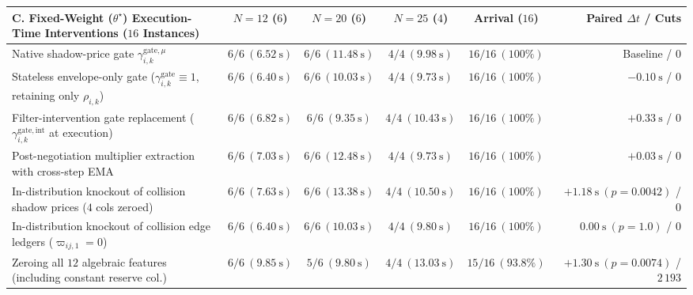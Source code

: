 \begin{table}[t]
\begin{tabularx}{\textwidth}{@{}Xccccr@{}}
 \midrule
 C. Fixed-Weight ($\theta^\star$) Execution-Time Interventions ($16$ Instances) & $N=12$ ($6$) & $N=20$ ($6$) & $N=25$ ($4$) & Arrival ($16$) & Paired $\Delta t$ / Cuts\\
 \midrule
 Native shadow-price gate $\gamma_{i,k}^{\mathrm{gate},\mu}$ & $6/6\ (6.52\ \mathrm s)$ & $6/6\ (11.48\ \mathrm s)$ & $4/4\ (9.98\ \mathrm s)$ & $16/16\ (100\%)$ & Baseline / $0$\\
 Stateless envelope-only gate ($\gamma_{i,k}^{\mathrm{gate}}\equiv 1$, retaining only $\rho_{i,k}$) & $6/6\ (6.40\ \mathrm s)$ & $6/6\ (10.03\ \mathrm s)$ & $4/4\ (9.73\ \mathrm s)$ & $16/16\ (100\%)$ & $-0.10\ \mathrm s$ / $0$\\
 Filter-intervention gate replacement ($\gamma_{i,k}^{\mathrm{gate,int}}$ at execution) & $6/6\ (6.82\ \mathrm s)$ & $6/6\ (9.35\ \mathrm s)$ & $4/4\ (10.43\ \mathrm s)$ & $16/16\ (100\%)$ & $+0.33\ \mathrm s$ / $0$\\
 Post-negotiation multiplier extraction with cross-step EMA & $6/6\ (7.03\ \mathrm s)$ & $6/6\ (12.48\ \mathrm s)$ & $4/4\ (9.73\ \mathrm s)$ & $16/16\ (100\%)$ & $+0.03\ \mathrm s$ / $0$\\
 In-distribution knockout of collision shadow prices ($4$ cols zeroed) & $6/6\ (7.63\ \mathrm s)$ & $6/6\ (13.38\ \mathrm s)$ & $4/4\ (10.50\ \mathrm s)$ & $16/16\ (100\%)$ & $\mathbf{+1.18\ \mathrm s}\ (p=0.0042)$ / $0$\\
 In-distribution knockout of collision edge ledgers ($\varpi_{ij,1}=0$) & $6/6\ (6.40\ \mathrm s)$ & $6/6\ (10.03\ \mathrm s)$ & $4/4\ (9.80\ \mathrm s)$ & $16/16\ (100\%)$ & $0.00\ \mathrm s\ (p=1.0)$ / $0$\\
 Zeroing all $12$ algebraic features (including constant reserve col.) & $6/6\ (9.85\ \mathrm s)$ & $5/6\ (9.80\ \mathrm s)$ & $4/4\ (13.03\ \mathrm s)$ & $15/16\ (93.8\%)$ & $+1.30\ \mathrm s\ (p=0.0074)$ / $2\,193$\\
 \bottomrule
 \end{tabularx}
\end{table}

